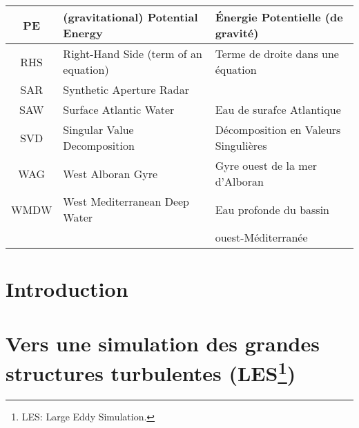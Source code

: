 \documentclass[a4paper,12pt,notitlepage,twoside]{report}
\numberwithin{equation}{section}
\begin{document}
\begin{table}[!h]
\begin{tabular}{|c|ll|}
                \hline
                PE & (gravitational) Potential Energy & Énergie Potentielle (de gravité)\\
                \hline
                RHS & Right-Hand Side (term of an equation) & Terme de droite dans une équation \\
                \hline
                SAR & Synthetic Aperture Radar & \\
                \hline
                SAW & Surface Atlantic Water & Eau de surafce Atlantique\\
                \hline
                SVD & Singular Value Decomposition & Décomposition en Valeurs Singulières  \\
                \hline
                WAG & West Alboran Gyre & Gyre ouest de la mer d'Alboran\\
                \hline
                WMDW & West Mediterranean Deep Water & Eau profonde du bassin\\
                & &ouest-Méditerranée\\
                \hline
        \end{tabular}
\end{table}


\newpage
\chapter{Introduction}
\label{chapINTRO}




\chapter[Vers une simulation des grandes structures turbulentes]{Vers une simulation des grandes structures turbulentes (LES\footnote{LES: Large Eddy Simulation.\label{LES}})}
\label{chap2}

\end{document}

